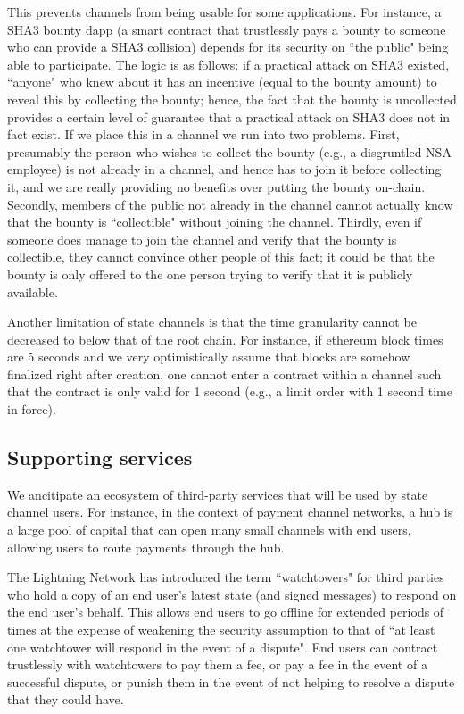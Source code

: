 \documentclass[prb,floatfix,reprint,nofootinbib,amsmath,amssymb,epsfig,pre,floats,letterpaper,groupedaffiliation,tightenlines,allcolors=blue,11pt]{revtex4}
\theoremstyle{definition}
\theoremstyle{definition}
\theoremstyle{definition}
\begin{document}
This prevents channels from being usable for some applications. For instance, a SHA3 bounty dapp (a smart contract that trustlessly pays a bounty to someone who can provide a SHA3 collision) depends for its security on ``the public" being able to participate. The logic is as follows: if a practical attack on SHA3 existed, ``anyone" who knew about it has an incentive (equal to the bounty amount) to reveal this by collecting the bounty; hence, the fact that the bounty is uncollected provides a certain level of guarantee that a practical attack on SHA3 does not in fact exist. If we place this in a channel we run into two problems. First, presumably the person who wishes to collect the bounty (e.g., a disgruntled NSA employee) is not already in a channel, and hence has to join it before collecting it, and we are really providing no benefits over putting the bounty on-chain. Secondly, members of the public not already in the channel cannot actually know that the bounty is ``collectible" without joining the channel. Thirdly, even if someone does manage to join the channel and verify that the bounty is collectible, they cannot convince other people of this fact; it could be that the bounty is only offered to the one person trying to verify that it is publicly available.

Another limitation of state channels is that the time granularity cannot be decreased to below that of the root chain. For instance, if ethereum block times are 5 seconds and we very optimistically assume that blocks are somehow finalized right after creation, one cannot enter a contract within a channel such that the contract is only valid for 1 second (e.g., a limit order with 1 second time in force).

\subsection{Supporting services}
\label{sec:supporting}

We ancitipate an ecosystem of third-party services that will be used by state channel users. For instance, in the context of payment channel networks, a hub is a large pool of capital that can open many small channels with end users, allowing users to route payments through the hub.

The Lightning Network has introduced the term ``watchtowers" for third parties who hold a copy of an end user's latest state (and signed messages) to respond on the end user's behalf. This allows end users to go offline for extended periods of times at the expense of weakening the security assumption to that of ``at least one watchtower will respond in the event of a dispute". End users can contract trustlessly with watchtowers to pay them a fee, or pay a fee in the event of a successful dispute, or punish them in the event of not helping to resolve a dispute that they could have.
\end{document}
